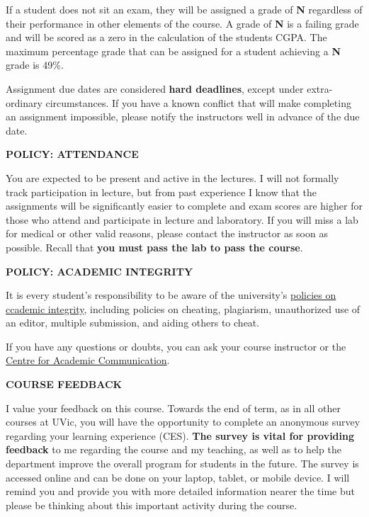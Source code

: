 \documentclass[11pt]{article}
\begin{document}
If a student does not sit an exam, they will be assigned a grade of \textbf{N} regardless of their performance in other elements of the course. A grade of \textbf{N} is a failing grade and will be scored as a zero in the calculation of the students CGPA. The maximum percentage grade that can be assigned for a student achieving a \textbf{N} grade is 49\%. 

Assignment due dates are considered \textbf{hard deadlines}, except under extra-ordinary circumstances. If you have a known conflict that will make completing an assignment impossible, please notify the instructors well in advance of the due date.

\textbf{POLICY: ATTENDANCE}

You are expected to be present and active in the lectures. I will not formally track participation in lecture, but from past experience I know that the assignments will be significantly easier to complete and exam scores are higher for those who attend and participate in lecture and laboratory. If you will miss a lab for medical or other valid reasons, please contact the instructor as soon as possible. Recall that \textbf{you must pass the lab to pass the course}.

\textbf{POLICY: ACADEMIC INTEGRITY}

It is every student's responsibility to be aware of the university's \href{https://web.uvic.ca/calendar/undergrad/info/regulations/academic-integrity.html}{policies on ccademic integrity}, including policies on cheating, plagiarism, unauthorized use of an editor, multiple submission, and aiding others to cheat. 

If you have any questions or doubts, you can ask your course instructor or the \href{https://uvic.ca/learningandteaching/cac}{Centre for Academic Communication}.

\begin{center}
  \textbf{COURSE FEEDBACK}
\end{center}
\smallskip
\vspace*{-.6em}
I value your feedback on this course. Towards the end of term, as in all other courses at UVic, you will have the opportunity to complete an anonymous survey regarding your learning experience (CES). \textbf{The survey is vital for providing feedback} to me regarding the course and my teaching, as well as to help the department improve the overall program for students in the future. The survey is accessed online and can be done on your laptop, tablet, or mobile device. I will remind you and provide you with more detailed information nearer the time but please be thinking about this important activity during the course.
\end{document}
